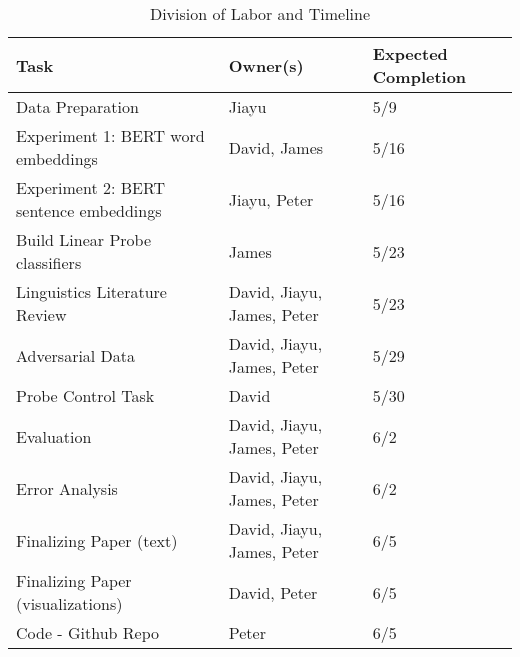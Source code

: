 \documentclass[11pt]{article}
\begin{document}
\begin{table*}[t!]
\begin{tabular}{|lll|}
\hline
\textbf{Task}                          & \textbf{Owner(s)}          & \textbf{Expected Completion} \\
\hline
Data Preparation                       & Jiayu                      & 5/9                          \\
Experiment 1: BERT word embeddings     & David, James               & 5/16                         \\
Experiment 2: BERT sentence embeddings & Jiayu, Peter               & 5/16                         \\
Build Linear Probe classifiers         & James                      & 5/23                         \\
Linguistics Literature Review          & David, Jiayu, James, Peter & 5/23                         \\
Adversarial Data                       & David, Jiayu, James, Peter & 5/29                         \\
Probe Control Task                     & David                      & 5/30                         \\
Evaluation                             & David, Jiayu, James, Peter & 6/2                          \\
Error Analysis                         & David, Jiayu, James, Peter & 6/2                          \\
Finalizing Paper (text)                & David, Jiayu, James, Peter & 6/5                          \\
Finalizing Paper (visualizations)      & David, Peter               & 6/5                          \\
Code - Github Repo                     & Peter                      & 6/5    \\
\hline
\end{tabular}
\caption{Division of Labor and Timeline}
\label{tab:labor}
\end{table*}
\end{document}

